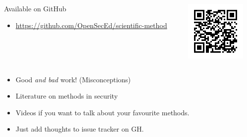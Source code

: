 \begin{frame}[fragile]
  \begin{columns}
    \begin{column}{0.7\columnwidth}
      \begin{block}{Available on GitHub}
        \begin{itemize}
          \item \url{https://github.com/OpenSecEd/scientific-method}
        \end{itemize}
      \end{block}
    \end{column}
    \begin{column}{0.3\columnwidth}
      \includegraphics[width=\columnwidth]{figs/GHurl.png}
    \end{column}
  \end{columns}

  \begin{remark}[Contributions]
    \begin{itemize}
      \item<+> Good \emph{and bad} work! (Misconceptions)
      \item<+> Literature on methods in security
      \item<+> Videos if you want to talk about your favourite methods.
      \item<+> Just add thoughts to issue tracker on GH.
    \end{itemize}
  \end{remark}
\end{frame}

